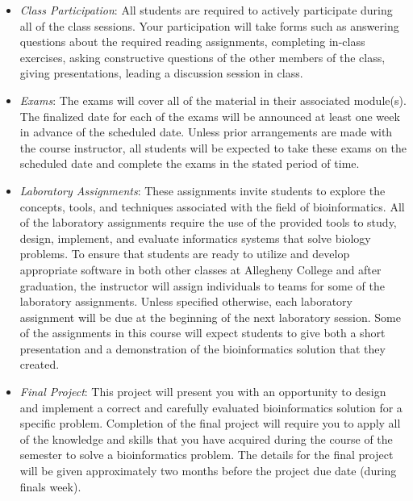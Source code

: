 \documentclass[11pt]{article} %
\begin{document}
\begin{itemize}

  \item {\em Class Participation}: All students are required to actively participate during all of the class sessions. Your participation will take forms such as answering questions about the required reading assignments, completing in-class exercises, asking constructive questions of the other members of the class, giving presentations, leading a discussion session in class.%

  \item {\em Exams}: The exams will cover all of the material in their associated module(s). The finalized date for each of the exams will be announced at least one week in advance of the scheduled date. Unless prior arrangements are made with the course instructor, all students will be expected to take these exams on the scheduled date and complete the exams in the stated period of time.
  
  \item {\em Laboratory Assignments}: These assignments invite students to explore the concepts, tools, and techniques associated with the field of bioinformatics.  All of the laboratory assignments require the use of the provided tools to study,  design, implement, and evaluate informatics systems that solve biology problems.  To ensure that students are ready to utilize and develop appropriate software in both other classes at Allegheny College and after graduation, the instructor will assign individuals to teams for some of the laboratory assignments.  Unless specified otherwise, each laboratory assignment will be due at the beginning of the next laboratory session.  Some of the  assignments in this course will expect students to give both a short presentation and a demonstration of the bioinformatics solution that they created.  

  \item {\em Final Project}: This project will present you with an opportunity to design and implement a correct and carefully evaluated bioinformatics solution for a specific problem. Completion of the final project will require you to apply all of the knowledge and skills that you have acquired during the course of the semester to solve a bioinformatics problem. The details for the final project will be given approximately two months before the project due date (during finals week).

  
\end{itemize}
\end{document}
